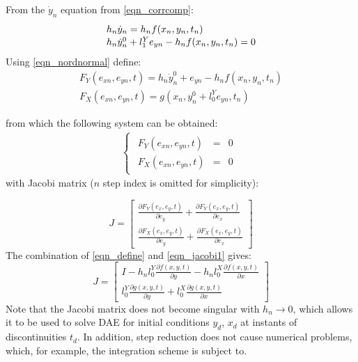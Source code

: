 \documentclass[lettersize,journal]{IEEEtran}
\begin{document}
From the \(\dot{y}_n\) equation from \eqref{eqn_corrcomp}:
\begin{equation}
	\label{eqn_corrdiff}
	\def\arraystretch{1.1}
	\begin{array}{l}
		h_n\dot{y}_n =  h_nf(x_n,y_n,t_n)\\
		h_n\dot{y}_n^0+l_1^Ye_{yn} - h_nf(x_n,y_n,t_n) = 0
	\end{array}
\end{equation}
Using \eqref{eqn_nordnormal} define:
\begin{equation}
	\label{eqn_define}
	\begin{array}{c}
		F_Y(e_{xn}, e_{yn}, t) = h_n\dot{y}_n^0+e_{yn}-h_nf(x_n, y_n, t_n) \\
		F_X(e_{xn}, e_{yn}, t) = g(x_n, y_n^0+l_0^Ye_{yn}, t_n)
	\end{array}
\end{equation}

\noindent from which the following system can be obtained:
\begin{equation}
	\label{eqn_system1}
	\begin{array}{c}
		\begin{cases}
			\begin{array}{rcl}
			F_Y(e_{xn}, e_{yn}, t) &=&0 \\
			F_X(e_{xn}, e_{yn}, t) &=&0 
			\end{array}
		\end{cases} 
	\end{array}
\end{equation}
\noindent with Jacobi matrix (\(n\) step index is omitted for simplicity):

\begin{equation}
	\label{eqn_jacobi1}
	J = \begin{bmatrix}
		\frac{\partial F_Y(e_x, e_y, t)}{\partial e_y}  +  \frac{\partial F_Y(e_x, e_y, t)}{\partial e_x} \\
		\frac{\partial F_X(e_x, e_y, t)}{\partial e_y}  +  \frac{\partial F_X(e_x, e_y, t)}{\partial e_x}
	\end{bmatrix}
\end{equation}
The combination of \eqref{eqn_define} and \eqref{eqn_jacobi1} gives:
\begin{equation}
	\label{eqn_jacobi2}
	J = \begin{bmatrix}
		I - h_nl_0^Y\frac{\partial f(x, y, t)}{\partial y}  -  h_nl_0^X\frac{\partial f(x, y, t)}{\partial x} \\
		l_0^Y\frac{\partial g(x, y, t)}{\partial y} +  l_0^X\frac{\partial g(x, y, t)}{\partial x} 
	\end{bmatrix}
\end{equation}
Note that the Jacobi matrix does not become singular with \(h_n\rightarrow 0\), which allows it to be used to solve DAE for initial conditions \(y_d\), \(x_d\) at instants of discontinuities \(t_d\). In addition, step reduction does not cause numerical problems, which, for example, the integration scheme \cite{petzold82} is subject to.
\end{document}
